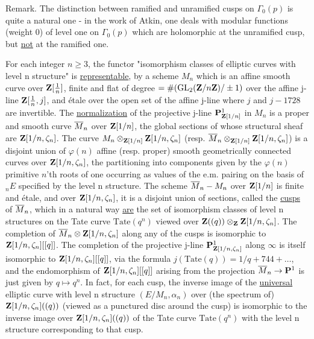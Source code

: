 \begin{kathmstar}{Remark.}
The distinction between ramified and unramified cusps on $\Gamma_0(p)$ is
quite a natural one - in the work of Atkin, one deals with modular functions
(weight 0) of level one on $\Gamma_0(p)$ which are holomorphic at the
unramified cusp, but \uline{not} at the ramified one.
\end{kathmstar}


For each integer $n\geq 3$, the functor "isomorphism classes of elliptic curves
with level n structure" is \uline{representable}, by a scheme $M_n$ which is an
affine smooth curve over $\mathbf{Z}[\frac{1}{n}]$, finite and flat of degree
$=\#(\operatorname{GL}_2(\mathbf{Z}/n\mathbf{Z})/\pm 1)$ over the affine j-line $\mathbf{Z}[\frac{1}{n},j]$, and
étale over the open set of the affine j-line where $j$ and $j-1728$ are
invertible. The \uline{normalization} of the projective j-line
$\mathbf{P}^1_{\mathbf{Z}[1/n]}$ in $M_n$ is a proper and smooth curve $\overline{M}_n$ over
$\mathbf{Z}[1/n]$, the global sections of whose structural sheaf are
$\mathbf{Z}[1/n,\zeta_n]$. The curve $M_n\otimes_{\mathbf{Z}[1/n]}\mathbf{Z}[1/n,\zeta_n]$ (resp.
$\overline{M}_n\otimes_{\mathbf{Z}[1/n]}\mathbf{Z}[1/n,\zeta_n]$) is a disjoint union of $\varphi(n)$
affine (resp. proper) smooth geometrically connected curves over
$\mathbf{Z}[1/n,\zeta_n]$, the partitioning into components given by the $\varphi(n)$
primitive $n$'th roots of one occurring as values of the e.m. pairing on the
basis of ${}_nE$ specified by the level n structure. The scheme $\overline{M}_n - M_n$
over $\mathbf{Z}[1/n]$ is finite and étale, and over $\mathbf{Z}[1/n,\zeta_n]$, it is a
disjoint union of sections, called the \uline{cusps} of $\overline{M}_n$, which in a
natural way \uline{are} the set of isomorphism classes of level n structures on
the Tate curve $\mathrm{Tate}(q^n)$ viewed over
$\mathbf{Z}((q))\otimes_{\mathbf{Z}}\mathbf{Z}[1/n,\zeta_n]$. The completion of
$\overline{M}_n\otimes\mathbf{Z}[1/n,\zeta_n]$ along any of the cusps is isomorphic to
$\mathbf{Z}[1/n,\zeta_n][[q]]$. The completion of the projective j-line
$\mathbf{P}^1_{\mathbf{Z}[1/n,\zeta_n]}$ along $\infty$ is itself isomorphic to
$\mathbf{Z}[1/n,\zeta_n][[q]]$, via the formula
$j(\mathrm{Tate}(q)) = 1/q + 744 + \ldots$, and the endomorphism of
$\mathbf{Z}[1/n,\zeta_n][[q]]$ arising from the projection $\overline{M}_n\to\mathbf{P}^1$ is just
given by $q\mapsto q^n$. In fact, for each cusp, the inverse image of the
\uline{universal} elliptic curve with level n structure $(E/M_n,\alpha_n)$ over
(the spectrum of) $\mathbf{Z}[1/n,\zeta_n]((q))$ (viewed as a punctured disc around the
cusp) is isomorphic to the inverse image over $\mathbf{Z}[1/n,\zeta_n]((q))$ of the
Tate curve $\mathrm{Tate}(q^n)$ with the level n structure corresponding to
that cusp.

